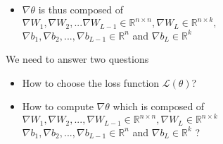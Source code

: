 \begin{frame}
\begin{overlayarea}{\textwidth}{\textheight}
\begin{itemize}
      \item<10-> $\nabla \theta$ is thus composed of \\
          $\nabla W_1, \nabla W_2, ... \nabla W_{L-1}\in \mathbb{R}^{n \times n}, \nabla W_{L} \in \mathbb{R}^{n \times k},$ \\
          $\nabla b_1, \nabla b_2, ..., \nabla b_{L-1} \in \mathbb{R}^n $ and $\nabla b_{L} \in \mathbb{R}^k$
    \end{itemize}
  \end{overlayarea}
\end{frame}

\begin{frame}
  \begin{block}{We need to answer two questions}
    \begin{itemize}
      \justifying
      \item<2-> How to choose the loss function $\mathscr{L}(\theta)$?
      \item<3-> How to compute $\nabla \theta$ which is composed of\\
      $\nabla W_1, \nabla W_2, ..., \nabla W_{L-1} \in \mathbb{R}^{n \times n}, \nabla W_L \in \mathbb{R}^{n \times k}$\\
      $\nabla b_1, \nabla b_2, ..., \nabla b_{L-1} \in \mathbb{R}^n $ and $\nabla b_L \in \mathbb{R}^k$ ?
    \end{itemize}
  \end{block}
\end{frame}

